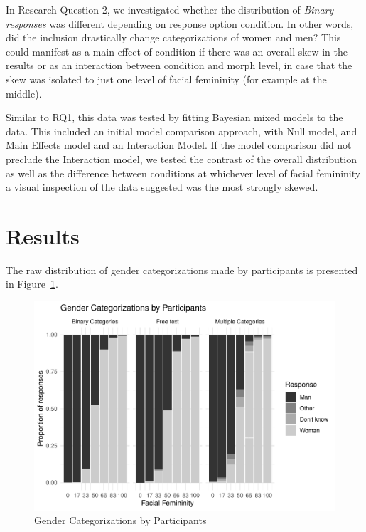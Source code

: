 \documentclass[
  man]{apa7}
\begin{document}
In Research Question 2, we investigated whether the distribution of \emph{Binary responses} was different depending on response option condition. In other words, did the inclusion drastically change categorizations of women and men? This could manifest as a main effect of condition if there was an overall skew in the results or as an interaction between condition and morph level, in case that the skew was isolated to just one level of facial femininity (for example at the middle).

Similar to RQ1, this data was tested by fitting Bayesian mixed models to the data. This included an initial model comparison approach, with Null model, and Main Effects model and an Interaction Model. If the model comparison did not preclude the Interaction model, we tested the contrast of the overall distribution as well as the difference between conditions at whichever level of facial femininity a visual inspection of the data suggested was the most strongly skewed.

\hypertarget{results}{%
\section{Results}\label{results}}

The raw distribution of gender categorizations made by participants is presented in Figure~\ref{fig:descriptives}.

\begin{figure}
\centering
\includegraphics{resp_opts_manus23022_files/figure-latex/descriptives-1.pdf}
\caption{\label{fig:descriptives}Gender Categorizations by Participants}
\end{figure}
\end{document}
